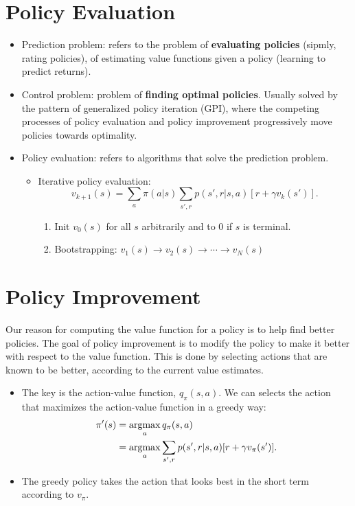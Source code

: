 \section{Policy Evaluation}
\begin{itemize}
	\item Prediction problem: refers to the problem of \textbf{evaluating policies} (sipmly, rating policies), of estimating value functions given a policy (learning to predict returns).
	\item Control problem: problem of \textbf{finding optimal policies}. Usually solved by the pattern of generalized policy iteration (GPI), where the competing processes of policy evaluation and policy improvement progressively move policies towards optimality.
	\item Policy evaluation: refers to algorithms that solve the prediction problem.
		\begin{itemize}
			\item Iterative policy evaluation:
				$$v_{k+1}(s)=\sum_{a}\pi(a|s)\sum_{s',r}p(s',r|s,a)[r + \gamma v_k(s')].$$ 
				\begin{enumerate}
					\item Init $v_0(s)$ for all $s$ arbitrarily and to 0 if $s$ is terminal. 
					\item Bootstrapping: $v_1(s)\to v_2(s)\to\cdots\to v_N(s)$
				\end{enumerate}
		\end{itemize}
\end{itemize}

\section{Policy Improvement}
Our reason for computing the value function for a policy is to help find better policies. The goal of policy improvement is to modify the policy to make it better with respect to the value function. This is done by selecting actions that are known to be better, according to the current value estimates.

\begin{itemize}
	\item The key is the action-value function, $q_\pi(s,a)$. We can selects the action that maximizes the action-value function in a greedy way: 
		\begin{align*}
			\pi'(s) &= \operatorname*{\operatorname{argmax}}_a q_\pi(s,a)\\
			&= \operatorname*{\operatorname{argmax}}_a \sum_{s',r}p(s',r|s,a)[r + \gamma v_\pi(s')].
		\end{align*}
	\item The greedy policy takes the action that looks best in the short term according to $v_\pi$.
\end{itemize}

